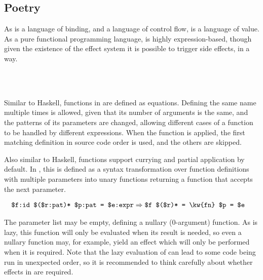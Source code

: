 \subsection{Poetry}

As \Law{} is a language of binding, and \Prose{} a language of control
flow, \Poetry{} is a language of value. As a pure functional programming
language, \Poetry{} is highly expression-based, though given the existence
of the effect system it is possible to trigger side effects, in a way.

\begin{bnf*}
     \\
     \\
\end{bnf*}

Similar to Haskell, functions in \Poetry{} are defined as equations. Defining
the same name multiple times is allowed, given that its number of arguments
is the same, and the patterns of its parameters are changed, allowing different
cases of a function to be handled by different expressions. When the function is
applied, the first matching definition in source code order is used, and the
others are skipped.

Also similar to Haskell, functions support currying and partial application by
default. In \Trilogy{}, this is defined as a syntax transformation over function
definitions with multiple parameters into unary functions returning a function
that accepts the next parameter.

\begin{align*}
    \texttt{\$f:id \$(\$r:pat)* \$p:pat = \$e:expr} & \Rightarrow \texttt{\$f \$(\$r)* = \kw{fn} \$p = \$e} %
\end{align*}

The parameter list may be empty, defining a nullary (0-argument) function. As
\Poetry{} is lazy, this function will only be evaluated when its result is
needed, so even a nullary function may, for example, yield an effect which will
only be performed when it is required. Note that the lazy evaluation of \Poetry{}
can lead to some code being run in unexpected order, so it is recommended to
think carefully about whether effects in \Poetry{} are required.

